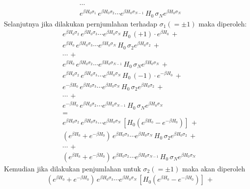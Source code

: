 \documentclass[a4paper , 12pt, cc]{article}
\begin{document}
\begin{enumerate}
\begin{enumerate}
\begin{align}
& \cdots \nonumber \\
& e^{\beta H_0 \sigma_1} \, e^{\beta H_0 \sigma_2} \cdots  e^{\beta H_0 \sigma_{N - 1} } \, H_0 \, \sigma_N e^{\beta H_0 \sigma_N}  
\end{align}
Selanjutnya jika dilakukan pernjumlahan terhadap $\sigma_1 ( = \pm 1)$ maka diperoleh:
\begin{align}
& e^{\beta H_0 \sigma_2} \, e^{\beta H_0 \sigma_3} \cdots e^{\beta H_0 \sigma_N} \, H_0 \, (+ 1 ) \cdot e^{\beta H_0 } \, + \nonumber \\
& e^{\beta H_0 } \, e^{\beta H_0 \sigma_3} \cdots e^{\beta H_0 \sigma_N } \, H_0 \, \sigma_2 e^{\beta H_0 \sigma_2} \, + \nonumber \\
& \cdots \, + \nonumber \\
& e^{\beta H_0  } \,  e^{\beta H_0 \sigma_2} \cdots e^{\beta H_0 \sigma_{N - 1}} \, H_0 \,  \sigma_N e^{\beta H_0 \sigma_N} \, + \nonumber \\
& e^{\beta H_0 \sigma_2} \, e^{\beta H_0 \sigma_3} \cdots e^{\beta H_0 \sigma_N} \, H_0 \, (- 1 ) \cdot e^{ - \beta H_0 } \, + \nonumber \\
& e^{ - \beta H_0 } \, e^{\beta H_0 \sigma_3} \cdots e^{\beta H_0 \sigma_N } \, H_0 \, \sigma_2 e^{\beta H_0 \sigma_2} \, + \nonumber  \\
& \cdots \, + \nonumber \\
& e^{ - \beta H_0  } \,  e^{\beta H_0 \sigma_2} \cdots e^{\beta H_0 \sigma_{N - 1}} \, H_0 \,  \sigma_N e^{\beta H_0 \sigma_N} \,  \nonumber  \\ 
 & =  \nonumber \\
 & e^{\beta H_0 \sigma_2} \, e^{\beta H_0 \sigma_3} \cdots e^{\beta H_0 \sigma_N} \,[ H_0  (   e^{\beta H_0 } - e^{-\beta H_0} ) ]  \, + \nonumber \\
 & ( e^{\beta H_0 }  + e^{ - \beta H_0 })  \, e^{\beta H_0 \sigma_3} \cdots e^{\beta H_0 \sigma_N } \, H_0 \, \sigma_2 e^{\beta H_0 \sigma_2} \, +  \nonumber \\
 & \cdots \, + \nonumber \\ 
 & ( e^{\beta H_0 }  + e^{ - \beta H_0 })  \, e^{\beta H_0 \sigma_2} \cdots e^{\beta H_0 \sigma_{N - 1} } \, H_0 \, \sigma_N e^{\beta H_0 \sigma_N} 
\end{align}
Kemudian jika dilakukan penjumlahan untuk $\sigma_2 ( = \pm 1) $ maka akan diperoleh 
\begin{align}
& ( e^{\beta H_0 }  + e^{ - \beta H_0 }) \, e^{\beta H_0 \sigma_3} \cdots e^{\beta H_0 \sigma_N} \,[ H_0  (   e^{\beta H_0 } - e^{-\beta H_0} ) ] \, +  \nonumber \\

\end{align}
\end{enumerate}
\end{enumerate}
\end{document}
